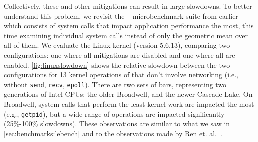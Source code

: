 Collectively, these and other mitigations can result in large
slowdowns. 
To better understand this problem, we revisit the 
\bench~\cite{lebench} microbenchmark suite from earlier which
consists of system calls
that impact application
performance the most, this time examining individual system calls instead of only the geometric mean over all of them.
We evaluate the Linux kernel (version 5.6.13),
comparing two configurations: one where all mitigations are disabled
and one where all are enabled. \autoref{fig:linuxslowdown} shows
the relative slowdown between the two configurations for 13 kernel
operations of \bench that don't involve networking (i.e., without
\texttt{send}, \texttt{recv}, \texttt{epoll}).  There are two sets of
bars, representing two generations of Intel CPUs: the older Broadwell,
and the newer Cascade Lake.  On Broadwell,
system calls that perform the least kernel work are impacted the most
(e.g., \texttt{getpid}), but a wide range of operations are impacted
significantly (25\%-100\% slowdowns). These observations are similar
to what we saw in \autoref{sec:benchmarks:lebench} and to the observations made by Ren et. al.~\cite{lebench}.



